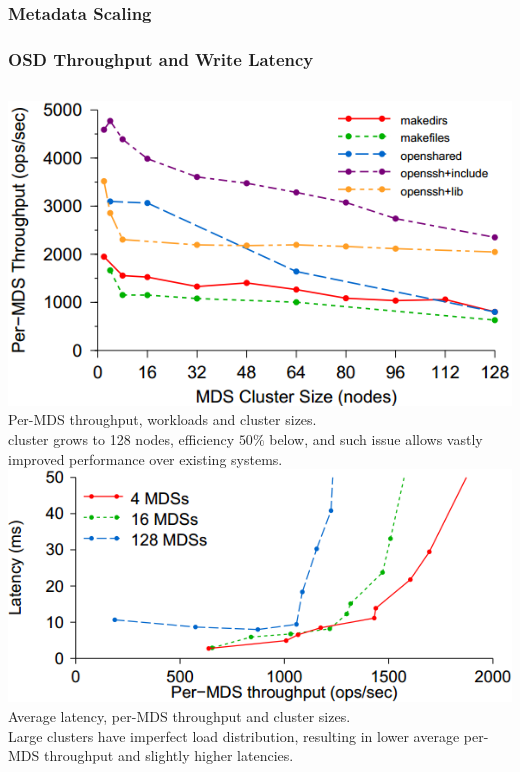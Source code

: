 \documentclass[cjk,slidestop,mathserif]{beamer}
\begin{document}
\begin{CJK}{UTF8}{gkai}
\begin{frame}
 \frametitle{Metadata Scaling}
 \frametitle{OSD Throughput and Write Latency}
 \vspace{6pt}
 \begin{columns}[c]
  \includegraphics[width=\columnwidth]{p10.png} \\
  Per-MDS throughput, workloads and cluster sizes. \\
  \vspace{4pt}
  cluster grows to 128 nodes, efficiency $50\%$ below, and such issue allows vastly improved performance 
  over existing systems.
  \includegraphics[width=\columnwidth]{p11.png} \\
  Average latency, per-MDS throughput and cluster sizes. \\
  \vspace{4pt}
  Large clusters have imperfect load distribution, resulting in lower average per-MDS throughput and 
  slightly higher latencies.
 \end{columns} 
\end{frame}



\end{CJK}
\end{document}
